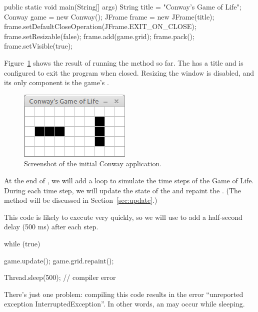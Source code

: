\begin{code}
public static void main(String[] args) {
    String title = "Conway's Game of Life";
    Conway game = new Conway();
    JFrame frame = new JFrame(title);
    frame.setDefaultCloseOperation(JFrame.EXIT_ON_CLOSE);
    frame.setResizable(false);
    frame.add(game.grid);
    frame.pack();
    frame.setVisible(true);
}
\end{code}

Figure~\ref{fig:conway} shows the result of running the  method so far.
The  has a title and is configured to exit the program when closed.
Resizing the window is disabled, and its only component is the game's .

\begin{figure}[!ht]
\begin{center}
\includegraphics{figs/conway.png}
\caption{Screenshot of the initial Conway application.}
\label{fig:conway}
\end{center}
\end{figure}

At the end of , we will add a  loop to simulate the time steps of the Game of Life.
During each time step, we will update the state of the  and repaint the .
(The  method will be discussed in Section~\ref{sec:update}.)

This code is likely to execute very quickly, so we will use  to add a half-second delay (500 ms) after each step.


\begin{code}
while (true) {
    game.update();
    game.grid.repaint();
    
    Thread.sleep(500);    // compiler error
}
\end{code}


There's just one problem: compiling this code results in the error ``unreported exception InterruptedException''.
In other words, an  may occur while sleeping.


